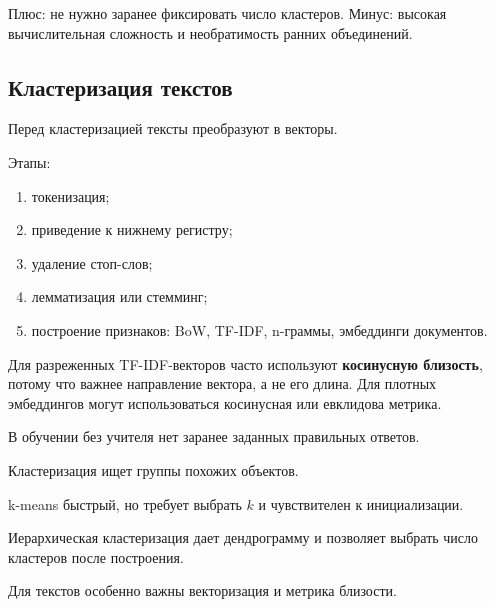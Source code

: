 Плюс: не нужно заранее фиксировать число кластеров. Минус: высокая вычислительная сложность и необратимость ранних объединений.

\subsection*{Кластеризация текстов}

Перед кластеризацией тексты преобразуют в векторы.

Этапы:
\begin{enumerate}
    \item токенизация;
    \item приведение к нижнему регистру;
    \item удаление стоп-слов;
    \item лемматизация или стемминг;
    \item построение признаков: BoW, TF-IDF, n-граммы, эмбеддинги документов.
\end{enumerate}

Для разреженных TF-IDF-векторов часто используют \textbf{косинусную близость}, потому что важнее направление вектора, а не его длина. Для плотных эмбеддингов могут использоваться косинусная или евклидова метрика.

\begin{important}
    \item В обучении без учителя нет заранее заданных правильных ответов.
    \item Кластеризация ищет группы похожих объектов.
    \item k-means быстрый, но требует выбрать $k$ и чувствителен к инициализации.
    \item Иерархическая кластеризация дает дендрограмму и позволяет выбрать число кластеров после построения.
    \item Для текстов особенно важны векторизация и метрика близости.
\end{important}
